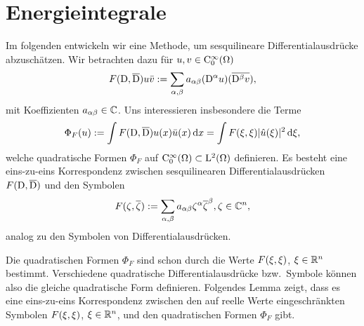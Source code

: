 \section{Energieintegrale}

Im folgenden entwickeln wir eine Methode, um sesquilineare Differentialausdrücke abzuschätzen.
Wir betrachten dazu für $u,v\in\mathrm C_0^\infty(\Omega)$
\begin{equation}
F(\mathrm D,\overline{\mathrm D})u\bar{v}
:=\sum_{\alpha,\beta}a_{\alpha\beta}(\mathrm D^\alpha u)(\overline{\mathrm D^\beta v}),
\end{equation}
mit Koeffizienten $a_{\alpha\beta}\in\mathbb C$. Uns interessieren insbesondere die Terme
\begin{equation}\label{eq:2:qf}
\Phi_F(u):=\int F(\mathrm D,\overline{\mathrm D})u(x)\bar{u}(x)\,\mathrm d x
=\int F(\xi,\xi)\lvert\hat{u}(\xi)\rvert^2\,\mathrm d \xi,
\end{equation}
welche quadratische Formen $\Phi_F$ auf $\mathrm C^\infty_0(\Omega)\subset \mathrm L^2(\Omega)$
definieren.
Es besteht eine eins-zu-eins Korrespondenz
zwischen sesquilinearen Differentialausdrücken $F(\mathrm D,\overline{\mathrm D})$
und den Symbolen
\begin{equation}
F(\zeta,\overline{\zeta}):=\sum_{\alpha,\beta}a_{\alpha\beta}\zeta^\alpha\overline{\zeta}^\beta, \zeta\in\mathbb C^n,
\end{equation}
analog zu den Symbolen von Differentialausdrücken.

Die quadratischen Formen $\Phi_F$
sind schon durch die Werte $F(\xi,\xi)$, $\xi\in\mathbb R^n$ bestimmt.
Verschiedene quadratische Differentialausdrücke bzw.~Symbole
können also die gleiche quadratische Form definieren.
Folgendes Lemma zeigt, dass es eine eins-zu-eins
Korrespondenz zwischen den auf reelle Werte eingeschränkten
Symbolen $F(\xi,\xi)$, $\xi\in\mathbb R^n$,
und den quadratischen Formen $\Phi_F$ gibt.

